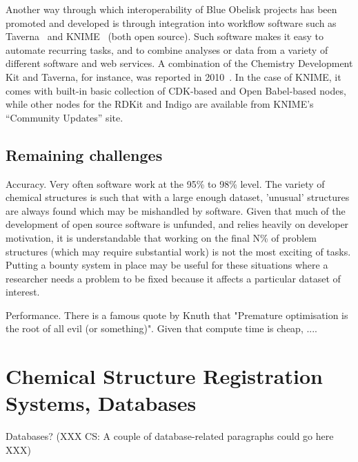 \documentclass[10pt]{bmc_article}
\newenvironment{bmcformat}{\fussy\setboolean{publ}{true}}{\fussy}
\begin{document}
\begin{bmcformat}
Another way through which interoperability of Blue Obelisk projects
has been promoted and developed is through integration into
workflow software such as Taverna~\cite{Hull:2006p60} and
KNIME~\cite{WebKNIME} (both open source).
Such software makes it easy to automate recurring
tasks, and to combine analyses or data from a variety of different software
and web services.
A combination of the Chemistry Development Kit and Taverna, for instance, was
reported in 2010~\cite{Kuhn:2010p4001}. 
In the case of KNIME, it comes with built-in basic collection of CDK-based and
Open Babel-based nodes, while other nodes for the RDKit and Indigo are
available from KNIME's ``Community Updates'' site.

  \subsection*{Remaining challenges}

Accuracy. Very often software work at the 95\% to 98\% level. The
variety of chemical structures is such that with a large enough
dataset, 'unusual' structures are always found which may be mishandled
by software. Given that much of the development of open source
software is unfunded, and relies heavily on developer motivation, it
is understandable that working on the final N\% of problem structures
(which may require substantial work) is not the most exciting of
tasks. Putting a bounty system in place may be useful for these
situations where a researcher needs a problem to be fixed because it
affects a particular dataset of interest.

Performance. There is a famous quote by Knuth that "Premature
optimisation is the root of all evil (or something)". Given that compute
time is cheap, ....

\section*{Chemical Structure Registration Systems, Databases}
Databases? (XXX CS: A couple of database-related paragraphs could go here XXX)


\end{bmcformat}
\end{document}
